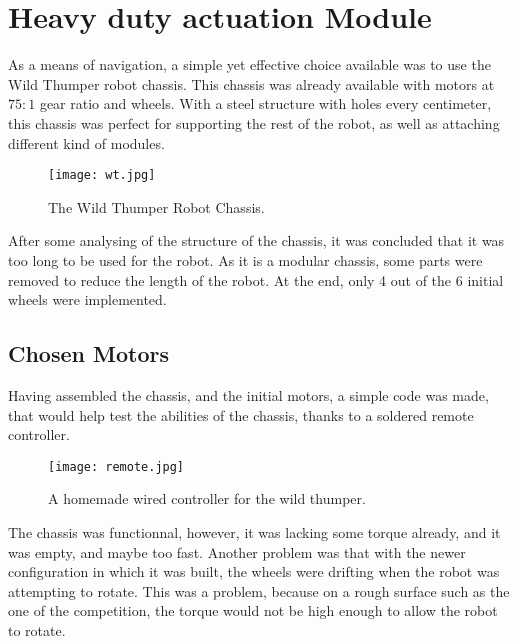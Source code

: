 %
%   
%

\section{Heavy duty actuation Module}

As a means of navigation, a simple yet effective choice available was to use the Wild Thumper robot chassis. This chassis was already available with motors at $75:1$ gear ratio and wheels. With a steel structure with holes every centimeter, this chassis was perfect for supporting the rest of the robot, as well as attaching different kind of modules.

\begin{figure}[H]
  \centering
  \texttt{[image: wt.jpg]}
  \caption{The Wild Thumper Robot Chassis.}
\label{fig:wt}
\end{figure}

After some analysing of the structure of the chassis, it was concluded that it was too long to be used for the robot. As it is a modular chassis, some parts were removed to reduce the length of the robot. At the end, only 4 out of the 6 initial wheels were implemented.

\subsection{Chosen Motors}

Having assembled the chassis, and the initial motors, a simple code was made, that would help test the abilities of the chassis, thanks to a soldered remote controller.\\

\begin{figure}[H]
  \centering
  \texttt{[image: remote.jpg]}
  \caption{A homemade wired controller for the wild thumper.}
\label{fig:remote}
\end{figure}

The chassis was functionnal, however, it was lacking some torque already, and it was empty, and maybe too fast. Another problem was that with the newer configuration in which it was built, the wheels were drifting when the robot was attempting to rotate. This was a problem, because on a rough surface such as the one of the competition, the torque would not be high enough to allow the robot to rotate.\\

